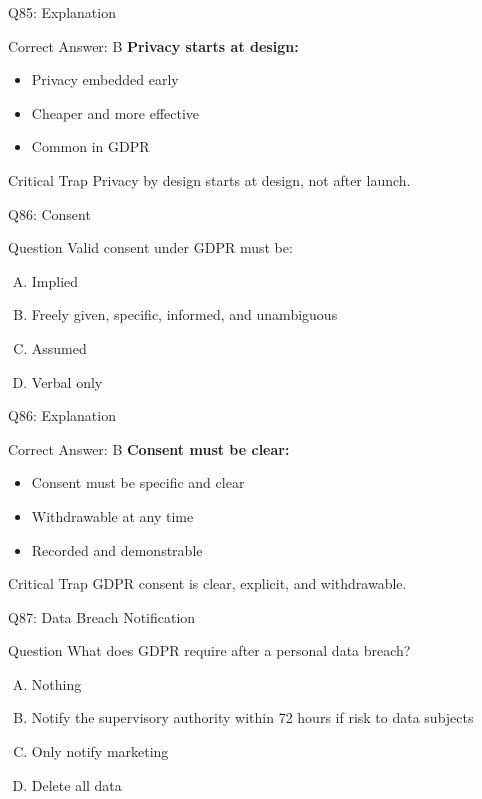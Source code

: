 \documentclass{beamer}
\begin{document}
	\begin{frame}{Q85: Explanation}
		\begin{block}{Correct Answer: B}
			\textbf{Privacy starts at design:}
			\begin{itemize}
				\item Privacy embedded early
				\item Cheaper and more effective
				\item Common in GDPR
			\end{itemize}
		\end{block}
		\begin{alertblock}{Critical Trap}
			Privacy by design starts at design, not after launch.
		\end{alertblock}
	\end{frame}
	
	\begin{frame}{Q86: Consent}
		\begin{block}{Question}
			Valid consent under GDPR must be:
		\end{block}
		\begin{enumerate}[(A)]
			\item Implied
			\item Freely given, specific, informed, and unambiguous
			\item Assumed
			\item Verbal only
		\end{enumerate}
	\end{frame}
	
	\begin{frame}{Q86: Explanation}
		\begin{block}{Correct Answer: B}
			\textbf{Consent must be clear:}
			\begin{itemize}
				\item Consent must be specific and clear
				\item Withdrawable at any time
				\item Recorded and demonstrable
			\end{itemize}
		\end{block}
		\begin{alertblock}{Critical Trap}
			GDPR consent is clear, explicit, and withdrawable.
		\end{alertblock}
	\end{frame}
	
	\begin{frame}{Q87: Data Breach Notification}
		\begin{block}{Question}
			What does GDPR require after a personal data breach?
		\end{block}
		\begin{enumerate}[(A)]
			\item Nothing
			\item Notify the supervisory authority within 72 hours if risk to data subjects
			\item Only notify marketing
			\item Delete all data
		\end{enumerate}
	\end{frame}
	
\end{document}
